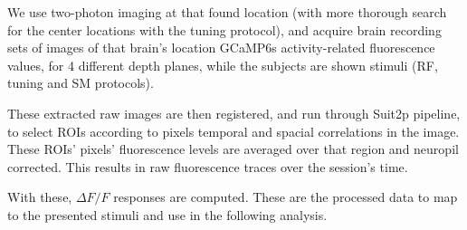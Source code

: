 We use two-photon imaging at that found location (with more thorough search for the center locations with the tuning protocol), and acquire brain recording sets of images of that brain's location GCaMP6s activity-related fluorescence values, for 4 different depth planes, while the subjects are shown stimuli (RF, tuning and SM protocols). 

These extracted raw images are then registered, and run through Suit2p pipeline, to select ROIs according to pixels temporal and spacial correlations in the image. These ROIs' pixels' fluorescence levels are averaged over that region and neuropil corrected. This results in raw fluorescence traces over the session's time.

With these, $\Delta F/F$ responses are computed. These are the processed data to map to the presented stimuli and use in the following analysis.

%
%
